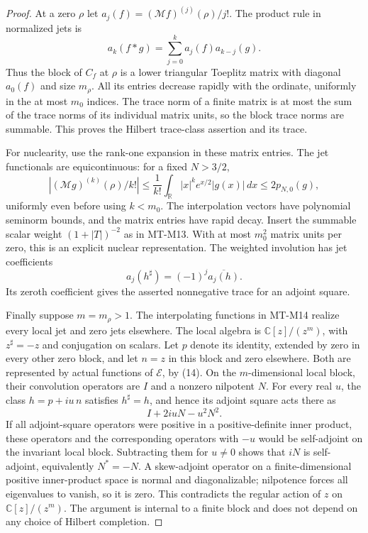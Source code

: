 \begin{proof}
At a zero $\rho$ let $a_j(f)=(\mathcal Mf)^{(j)}(\rho)/j!$.
The product rule in normalized jets is
\[
       a_k(f*g)=\sum_{j=0}^k a_j(f)a_{k-j}(g).
\]
Thus the block of $C_f$ at $\rho$ is a lower triangular
Toeplitz matrix with diagonal $a_0(f)$ and size $m_\rho$.
All its entries decrease rapidly with the ordinate,
uniformly in the at most $m_0$ indices.
The trace norm of a finite matrix is at most the sum
of the trace norms of its individual matrix units,
so the block trace norms are summable. This proves
the Hilbert trace-class assertion and its trace.

For nuclearity, use the rank-one expansion in these
matrix entries. The jet functionals are equicontinuous:
for a fixed $N>3/2$,
\[
 |(\mathcal Mg)^{(k)}(\rho)/k!|
 \le \frac1{k!}\int_{\mathbb R}|x|^k e^{x/2}|g(x)|\,dx
 \le2p_{N,0}(g),
\]
uniformly even before using $k<m_0$.
The interpolation vectors have polynomial seminorm
bounds, and the matrix entries have rapid decay.
Insert the summable scalar weight $(1+|T|)^{-2}$
as in MT-M13. With at most $m_0^2$ matrix units per
zero, this is an explicit nuclear representation.
The weighted involution has jet coefficients
\[
                   a_j(h^\sharp)=(-1)^j\overline{a_j(h)}.
\]
Its zeroth coefficient gives the asserted nonnegative
trace for an adjoint square.

Finally suppose $m=m_\rho>1$. The interpolating functions
in MT-M14 realize every local jet and zero jets elsewhere.
The local algebra is $\mathbb C[z]/(z^m)$, with
$z^\sharp=-z$ and conjugation on scalars.
Let $p$ denote its identity, extended by zero in every
other zero block, and let $n=z$ in this block and zero
elsewhere. Both are represented by actual functions
of $\mathcal E$, by (14). On the $m$-dimensional local
block, their convolution operators are $I$ and a
nonzero nilpotent $N$.
For every real $u$, the class $h=p+iu\,n$ satisfies
$h^\sharp=h$, and hence its adjoint square acts there as
\[
                         I+2iuN-u^2N^2.
\]
If all adjoint-square operators were positive in a
positive-definite inner product, these operators and
the corresponding operators with $-u$ would be
self-adjoint on the invariant local block.
Subtracting them for $u\ne0$ shows that $iN$ is
self-adjoint, equivalently $N^*=-N$.
A skew-adjoint operator on a finite-dimensional positive
inner-product space is normal and diagonalizable;
nilpotence forces all eigenvalues to vanish, so it is
zero. This contradicts the regular action of $z$
on $\mathbb C[z]/(z^m)$.
The argument is internal to a finite block and
does not depend on any choice of Hilbert completion.
\end{proof}

